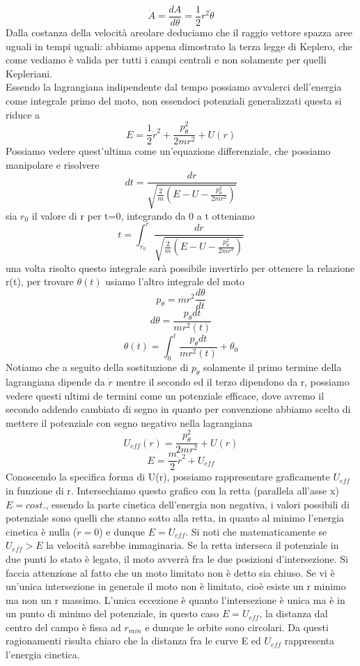\documentclass[
10pt, %
a4paper, %
oneside, %
headinclude,footinclude, %
BCOR5mm, %
]{scrartcl}
\begin{document}
\[\dot{A} = \frac{dA}{d\theta} = \frac{1}{2}r^2\dot{\theta}\]
Dalla costanza della velocità areolare deduciamo che il raggio vettore spazza aree uguali in tempi uguali: abbiamo appena dimostrato la terza legge di Keplero, che come vediamo è valida per tutti i campi centrali e non solamente per quelli Kepleriani.\\
Essendo la lagrangiana indipendente dal tempo possiamo avvalerci dell'energia come integrale primo del moto, non essendoci potenziali generalizzati questa si riduce a 
\[E = \frac{1}{2}\dot{r}^2 + \frac{p_{\theta}^2 }{2mr^2}+U(r)\]
Possiamo vedere quest'ultima come un'equazione differenziale, che possiamo manipolare e risolvere
\[dt = \frac{dr}{\sqrt{\frac{2}{m}\left(E-U-\frac{p_{\theta}^2 }{2mr^2}\right)}}\]
sia \(r_0\) il valore di r per t=0, integrando da 0 a t otteniamo
\[t = \int_{r_0}^{r}\frac{dr}{\sqrt{\frac{2}{m}\left(E-U-\frac{p_{\theta}^2 }{2mr^2}\right)}}\]
una volta risolto questo integrale sarà possibile invertirlo per ottenere la relazione r(t), per trovare $\theta(t)$ usiamo l'altro integrale del moto
\[p_{\theta} = mr^2\frac{d\theta}{dt}\]
\[d\theta = \frac{p_{\theta}dt}{mr^2(t)}\]
\[\theta(t) = \int_0^t \frac{p_{\theta}dt}{mr^2(t)}+\theta_0\]
Notiamo che a seguito della sostituzione di \(p_{\theta}\) solamente il primo termine della lagrangiana dipende da $\dot{r}$ mentre il secondo ed il terzo dipendono da r, possiamo vedere questi ultimi de termini come un potenziale efficace, dove avremo il secondo addendo cambiato di segno in quanto per convenzione abbiamo scelto di mettere il potenziale con segno negativo nella lagrangiana
\[U_{eff}(r) = \frac{p_{\theta}^2 }{2mr^2}+U(r)\]
\[E = \frac{m}{2}\dot{r}^2+U_{eff}\]
Conoscendo la specifica forma di U(r), possiamo rappresentare graficamente \(U_{eff}\) in funzione di r. Intersechiamo questo grafico con la retta (parallela all'asse x) \(E = cost.\), essendo la parte cinetica dell'energia non negativa, i valori possibili di potenziale sono quelli che stanno sotto alla retta, in quanto al minimo l'energia cinetica è nulla ($\dot{r} = 0$) e dunque \(E = U_{eff}\). Si noti che matematicamente se \(U_{eff}>E\) la velocità sarebbe immaginaria. Se la retta interseca il potenziale in due punti lo stato è legato, il moto avverrà fra le due posizioni d'intersezione. Si faccia attenzione al fatto che un moto limitato non è detto sia chiuso. Se vi è un'unica intersezione in generale il moto non è limitato, cioè esiste un r minimo ma non un r massimo. L'unica eccezione è quanto l'intersezione è unica ma è in un punto di minimo del potenziale, in questo caso \(E = U_{eff}\), la distanza dal centro del campo è fissa ad \(r_{min}\) e dunque le orbite sono circolari. Da questi ragionamenti risulta chiaro che la distanza fra le curve E ed \(U_{eff}\) rappresenta l'energia cinetica.
\end{document}
